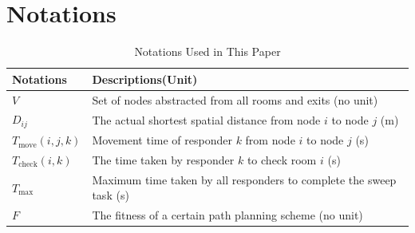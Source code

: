 \section{Notations}
\vspace{-1cm}%

\begin{table}[htbp]
	\begin{center}
		\caption{Notations Used in This Paper}
		\begin{tabular}{l l}%
			\toprule[2pt]
			\multicolumn{1}{m{3cm}}{\textbf{Notations}}
			&\multicolumn{1}{m{8cm}}{
			\textbf{Descriptions(Unit)}}\\
			\midrule
			  $V$& Set of nodes abstracted from all rooms and exits (no unit) \\	
			  $D_{ij}$& The actual shortest spatial distance from node $i$ to node $j$ (m)\\
			  $T_{\text{move}}(i,j,k)$& Movement time of responder $k$ from node $i$ to node $j$ (s) \\
			  $T_{\text{check}}(i,k)$& The time taken by responder $k$ to check room $i$ (s) \\
			  $T_{\text{max}}$& Maximum time taken by all responders to complete the sweep task (s) \\
			  $F$& The fitness of a certain path planning scheme (no unit) \\
			\bottomrule[2pt]
		\end{tabular}\label{notation}		
	\end{center}
\end{table}

\vspace{-1cm}%
